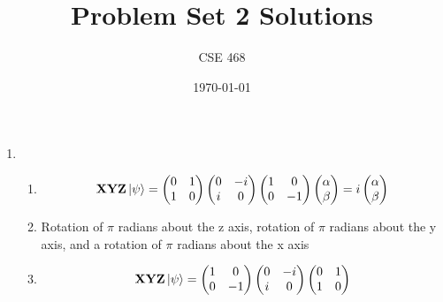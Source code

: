 \documentclass[12pt]{article}
\title{Problem Set 2 Solutions}
\author{CSE 468}
\date{\today}
\begin{document}
\maketitle

\begin{enumerate}[font=\bfseries]
    \item 
    \begin{enumerate}
        \item \[ \mathbf{X}\mathbf{Y}\mathbf{Z}\ket{\psi} = 
                \begin{pmatrix} 
                0 & 1 \\
                1 & 0
                \end{pmatrix} 
                \begin{pmatrix} 
                0 & -i \\
                i & 0
                \end{pmatrix} 
                 \begin{pmatrix} 
                1 & 0 \\
                0 & -1
                \end{pmatrix} 
                 \begin{pmatrix} 
                \alpha \\ \beta
                \end{pmatrix} 
                =
                i
                \begin{pmatrix} 
                \alpha \\ \beta
                \end{pmatrix} 
                \]
        \item Rotation of $\pi$ radians about the z axis, rotation of $\pi$ radians about the y axis, and a rotation of $\pi$ radians about the x axis
        \item \[ \mathbf{X}\mathbf{Y}\mathbf{Z}\ket{\psi} = 
                \begin{pmatrix} 
                1 & 0 \\
                0 & -1
                \end{pmatrix} 
                \begin{pmatrix} 
                0 & -i \\
                i & 0
                \end{pmatrix} 
                 \begin{pmatrix} 
                0 & 1 \\
                1 & 0

\end{pmatrix}\]
\end{enumerate}
\end{enumerate}
\end{document}
